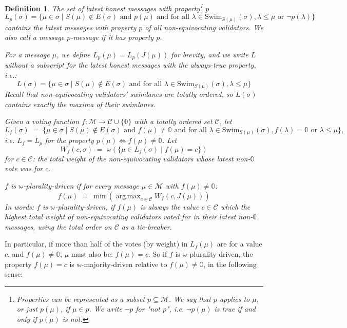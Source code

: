 \documentclass[12pt, fleqn]{article}
\newtheorem{definition}{Definition}
\newcommand{\ww}{\mathbb{w}}
\DeclareMathOperator*{\argmax}{arg\,max}
\begin{document}
\begin{definition}
  The set of \emph{latest honest messages with property\footnote{Properties can be represented as a subset $p \subseteq \mathcal{M}$. We say that $p$ \emph{applies to $\mu$}, or just $p(\mu)$, if $\mu \in p$. We write $\neg p$ for "not $p$", i.e. $\neg p(\mu)$ is true if and only if $p(\mu)$ is not.} $p$}
  $$L_p(\sigma) = \{ \mu \in \sigma \mid S(\mu) \notin E(\sigma) \text{ and } p(\mu) \text{ and for all } \lambda \in \mathrm{Swim}_{S(\mu)}(\sigma), \lambda \leq \mu \text{ or } \neg p(\lambda) \}$$
contains the latest messages with property $p$ of all non-equivocating validators. We also call a message \emph{$p$-message} if it has property $p$.

  For a message $\mu$, we define $L_p(\mu) = L_p(J(\mu))$ for brevity, and we write $L$ without a subscript for the latest honest messages with the always-true property, i.e.:
  $$L(\sigma) = \{ \mu \in \sigma \mid S(\mu) \notin E(\sigma) \text{ and for all } \lambda \in \mathrm{Swim}_{S(\mu)}(\sigma), \lambda \leq \mu \}$$
Recall that non-equivocating validators' swimlanes are totally ordered, so $L(\sigma)$ contains exactly the maxima of their swimlanes.

  Given a voting function $f: \mathcal{M} \rightarrow \mathcal{C} \cup \{ \mathbb{0} \}$ with a totally ordered set $\mathcal{C}$, let
  $$L_f(\sigma) \;=\; \{ \mu \in \sigma \mid S(\mu) \notin E(\sigma) \text{ and } f(\mu) \neq \mathbb{0} \text{ and for all } \lambda \in \mathrm{Swim}_{S(\mu)}(\sigma), f(\lambda) = \mathbb{0} \text{ or } \lambda \leq \mu \}\text{,}$$
  i.e. $L_f = L_p$ for the property $p(\mu) \Leftrightarrow f(\mu) \neq \mathbb{0}$. Let
  $$W_f(c, \sigma) \;=\; \ww(\{ \mu \in L_f(\sigma) \mid f(\mu) = c\})$$
  for $c \in \mathcal{C}$: the total weight of the non-equivocating validators whose latest non-$\mathbb{0}$ vote was for $c$.

  $f$ is \emph{$\ww$-plurality-driven} if for every message $\mu \in \mathcal{M}$ with $f(\mu) \neq \mathbb{0}$:
  $$f(\mu) \;=\; \min \left(\argmax_{c \in \mathcal{C}} W_f(c, J(\mu))\right)$$
  In words: $f$ is $\ww$-plurality-driven, if $f(\mu)$ is always the value $c \in \mathcal{C}$ which the highest total weight of non-equivocating validators voted for in their latest non-$\mathbb{0}$ messages, using the total order on $\mathcal{C}$ as a tie-breaker.
\end{definition}

In particular, if more than half of the votes (by weight) in $L_f(\mu)$ are for a value $c$, and $f(\mu) \neq \mathbb{0}$, $\mu$ must also be: $f(\mu) = c$. So if $f$ is $\ww$-plurality-driven, the property $f(\mu) = c$ is $\ww$-majority-driven relative to $f(\mu) \neq \mathbb{0}$, in the following sense:
\end{document}
